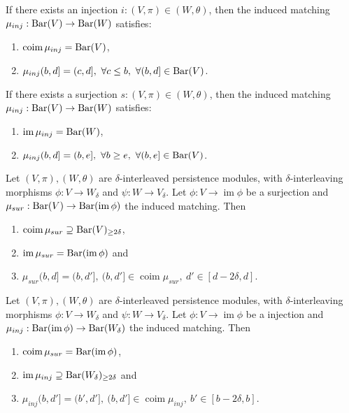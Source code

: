 \begin{lemma}
    If there exists an injection $i: (V, \pi) \in (W, \theta) $, then the induced matching $ \mu_{inj}: \operatorname{Bar}(V) \to \operatorname{Bar} (W) $ satisfies:
    \begin{enumerate}
        \item $\operatorname{coim} \mu_{inj} = \operatorname{Bar}(V)$,
        \item $\mu_{inj}(b, d] = (c, d], \ \forall c \leq b, \ \forall (b, d] \in \operatorname{Bar}(V)$.
    \end{enumerate}
\end{lemma}

\begin{lemma}
    If there exists a surjection $s: (V, \pi) \in (W, \theta) $, then the induced matching $ \mu_{inj}: \operatorname{Bar}(V) \to \operatorname{Bar} (W) $ satisfies:
    \begin{enumerate}
        \item $\operatorname{im} \mu_{inj} = \operatorname{Bar}(W)$,
        \item $\mu_{inj}(b, d] = (b, e], \ \forall b \geq e, \ \forall (b, e] \in \operatorname{Bar}(V)$.
    \end{enumerate}
\end{lemma}

\begin{lemma}
    Let $ (V, \pi), (W, \theta) $ are $\delta$-interleaved persistence modules, with $\delta$-interleaving morphisms $ \phi: V \to W_\delta $ and $ \psi: W \to V_\delta $. Let $ \phi: V \to \operatorname{im}\phi $ be a surjection and $ \mu_{sur}: \operatorname{Bar}(V) \to \operatorname{Bar} (\operatorname{im} \phi)$ the induced matching. Then
    \begin{enumerate}
        \item $\operatorname{coim} \mu_{sur} \supseteq \operatorname{Bar} (V)_{\geq 2\delta} $,
        \item $ \operatorname{im} \mu_{sur} = \operatorname{Bar} (\operatorname{im} \phi)$ and
        \item $ \mu_{sur}(b, d] = (b, d'], \ (b, d'] \in \operatorname{coim} \mu_{sur}, \ d' \in [d-2\delta, d]$.
    \end{enumerate}
\end{lemma}

\begin{lemma}
    Let $ (V, \pi), (W, \theta) $ are $\delta$-interleaved persistence modules, with $\delta$-interleaving morphisms $ \phi: V \to W_\delta $ and $ \psi: W \to V_\delta $. Let $ \phi: V \to \operatorname{im}\phi $ be a injection and $ \mu_{inj}: \operatorname{Bar}(\operatorname{im} \phi) \to \operatorname{Bar} (W_\delta)$ the induced matching. Then
    \begin{enumerate}
        \item $\operatorname{coim} \mu_{sur} = \operatorname{Bar} (\operatorname{im} \phi) $,
        \item $ \operatorname{im} \mu_{inj} \supseteq \operatorname{Bar} (W_\delta)_{\geq 2\delta} $ and
        \item $ \mu_{inj}(b, d'] = (b', d'], \ (b, d'] \in \operatorname{coim} \mu_{inj}, \ b' \in [b-2\delta, b]$.
    \end{enumerate}
\end{lemma}

